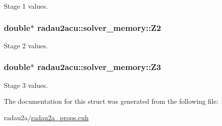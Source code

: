 Stage 1 values. 

\subsubsection[{\texorpdfstring{Z2}{Z2}}]{\setlength{\rightskip}{0pt plus 5cm}double$\ast$ radau2acu\+::solver\+\_\+memory\+::\+Z2}\hypertarget{structradau2acu_1_1solver__memory_a01e0b1a2d05bcd51d00cb1418a790d79}{}\label{structradau2acu_1_1solver__memory_a01e0b1a2d05bcd51d00cb1418a790d79}


Stage 2 values. 

\subsubsection[{\texorpdfstring{Z3}{Z3}}]{\setlength{\rightskip}{0pt plus 5cm}double$\ast$ radau2acu\+::solver\+\_\+memory\+::\+Z3}\hypertarget{structradau2acu_1_1solver__memory_ac4d01cd67d75acfe199be4d4676c0bf7}{}\label{structradau2acu_1_1solver__memory_ac4d01cd67d75acfe199be4d4676c0bf7}


Stage 3 values. 



The documentation for this struct was generated from the following file\+:\begin{DoxyCompactItemize}
\item 
radau2a/\hyperlink{radau2a__props_8cuh}{radau2a\+\_\+props.\+cuh}\end{DoxyCompactItemize}
